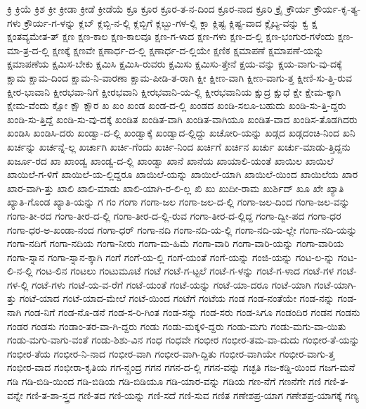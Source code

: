 {ಕ್ರಿ
ಕ್ರಿಯೆ
ಕ್ರಿಶ
ಕ್ರೀ
ಕ್ರೀಡಾ
ಕ್ರೀಡೆ
ಕ್ರೀಡೆಯೆ
ಕ್ರೂ
ಕ್ರೂರ
ಕ್ರೂರ-ತ-ನ-ದಿಂದ
ಕ್ರೂರ-ನಾದ
ಕ್ರೂರಿ
ಕ್ರೈ
ಕ್ರೌರ್ಯ
ಕ್ರೌರ್ಯ-ಕೃ-ತ್ಯ-ಗಳು
ಕ್ರೌರ್ಯ-ಗ-ಳನ್ನು
ಕ್ಲಬ್
ಕ್ಲಬ್ಬಿ-ನ-ಲ್ಲಿ
ಕ್ಲಬ್ಬಿಗೆ
ಕ್ಲಬ್ಬು-ಗಳ-ಲ್ಲಿ
ಕ್ಲಾ
ಕ್ಲಿಷ್ಟ
ಕ್ಲಿಷ್ಟ-ವಾದ
ಕ್ಲೈಬ್ಯ-ವನ್ನು
ಕ್ವ
ಕ್ಷ
ಕ್ಷಂತವ್ಯಮೇತ-ತ್
ಕ್ಷಣ
ಕ್ಷಣ-ಕಾಲ
ಕ್ಷಣ-ಕಾಲವೂ
ಕ್ಷಣ-ಗ-ಳಾದ
ಕ್ಷಣ-ಗಳು
ಕ್ಷಣ-ದ-ಲ್ಲಿ
ಕ್ಷಣ-ಭಂಗುರ-ಗಳೆಂದು
ಕ್ಷಣ-ಮಾ-ತ್ರ-ದ-ಲ್ಲಿ
ಕ್ಷಣಕ್ಕೆ
ಕ್ಷಣವೇ
ಕ್ಷಣಾರ್ಧ-ದ-ಲ್ಲಿ
ಕ್ಷಣಾರ್ಧ-ದ-ಲ್ಲಿಯೇ
ಕ್ಷಣಿಕ
ಕ್ಷಮಾಪಣೆ
ಕ್ಷಮಾಪಣೆ-ಯನ್ನು
ಕ್ಷಮಾಪಣೆಯ
ಕ್ಷಮಿಸ-ಬೇಕು
ಕ್ಷಮಿಸಿ
ಕ್ಷಮಿಸಿ-ರುವರು
ಕ್ಷಮಿಸು
ಕ್ಷಮಿಸು-ತ್ತೇನೆ
ಕ್ಷಯ-ವನ್ನು
ಕ್ಷಯ-ವಾಗು-ವು-ದಕ್ಕೆ
ಕ್ಷಾಮ
ಕ್ಷಾಮ-ದಿಂದ
ಕ್ಷಾಮ-ನಿ-ವಾರಣಾ
ಕ್ಷಾಮ-ಪೀಡಿ-ತ-ರಾಗಿ
ಕ್ಷೀ
ಕ್ಷೀಣ-ವಾಗಿ
ಕ್ಷೀಣ-ವಾಗು-ತ್ತ
ಕ್ಷೀಣಿ-ಸು-ತ್ತಿ-ರುವ
ಕ್ಷೀರ-ಭಾವಾನಿ
ಕ್ಷೀರಭವಾ-ನಿಗೆ
ಕ್ಷೀರಭವಾನಿ
ಕ್ಷೀರಭವಾನಿ-ಯ-ಲ್ಲಿ
ಕ್ಷೀರಭವಾನಿಯ
ಕ್ಷುದ್ರ
ಕ್ಷುಧೆ
ಕ್ಷೇ
ಕ್ಷೇಮ-ಕ್ಕಾಗಿ
ಕ್ಷೇಮ-ವೆಂದು
ಕ್ಷೋ
ಕ್ಷೌ
ಕ್ಷೌರ
ಖ
ಖಂ
ಖಂಡ
ಖಂಡ-ದ-ಲ್ಲಿ
ಖಂಡದ
ಖಂಡಿ-ಸಲೂ-ಬಹುದು
ಖಂಡಿ-ಸು-ತ್ತಿ-ದ್ದರು
ಖಂಡಿ-ಸು-ತ್ತಿದ್ದೆ
ಖಂಡಿ-ಸು-ವು-ದಕ್ಕೆ
ಖಂಡಿತ
ಖಂಡಿತ-ವಾಗಿ
ಖಂಡಿತ-ವಾಗಿಯೂ
ಖಂಡಿತ-ವಾದ
ಖಂಡಿಸ-ತೊಡಗಿದರು
ಖಂಡಿಸಿ
ಖಂಡಿಸಿ-ದರು
ಖಂಡ್ವಾ-ದ-ಲ್ಲಿ
ಖಂಡ್ವಾಕ್ಕೆ
ಖಂಡ್ವಾದ-ಲ್ಲಿದ್ದು
ಖಚೋರಿ-ಯನ್ನು
ಖಡ್ಗದ
ಖಡ್ಗದಂಚಿ-ನಿಂದ
ಖನಿ
ಖರ್ಚನ್ನು
ಖರ್ಚನ್ನೆ-ಲ್ಲ
ಖರ್ಚಾಗಿ
ಖರ್ಚಿ-ಗೆಂದು
ಖರ್ಚಿ-ನಿಂದ
ಖರ್ಚಿಗೆ
ಖರ್ಚಿನ
ಖರ್ಚು
ಖರ್ಚು-ಮಾಡು-ತ್ತಿದ್ದನು
ಖರ್ಜೂ-ರದ
ಖಾ
ಖಾಂಡ್ವ
ಖಾಂಡ್ವ-ದ-ಲ್ಲಿ
ಖಾಂಡ್ವಾ
ಖಾನೆ
ಖಾನೆಯ
ಖಾಯಾಲಿ-ಯಂತೆ
ಖಾಯಿಲ
ಖಾಯಿಲೆ
ಖಾಯಿಲೆ-ಗ-ಳಿಗೆ
ಖಾಯಿಲೆ-ಯ-ಲ್ಲಿದ್ದರೂ
ಖಾಯಿಲೆ-ಯನ್ನು
ಖಾಯಿಲೆ-ಯಾಗಿ
ಖಾಯಿಲೆ-ಯಿಂದ
ಖಾಯಿಲೆಯ
ಖಾರ
ಖಾರ-ವಾಗಿ-ತ್ತು
ಖಾಲಿ
ಖಾಲಿ-ಮಾಡು
ಖಾಲಿ-ಯಾಗಿ-ರ-ಲಿ-ಲ್ಲ
ಖಿ
ಖು
ಖುದೀ-ರಾಮ
ಖುರ್ಶಿದ್
ಖೂ
ಖೇ
ಖ್ಯಾತಿ
ಖ್ಯಾತಿ-ಗೊಂಡ
ಖ್ಯಾತಿ-ಯನ್ನು
ಗ
ಗಂ
ಗಂಗಾ
ಗಂಗಾ-ಜಲ
ಗಂಗಾ-ಜಲ-ದ-ಲ್ಲಿ
ಗಂಗಾ-ಜಲ-ದಿಂದ
ಗಂಗಾ-ಜಲ-ವನ್ನು
ಗಂಗಾ-ತೀ-ರದ
ಗಂಗಾ-ತೀರ-ದ-ಲ್ಲಿ
ಗಂಗಾ-ತೀರ-ದ-ಲ್ಲಿ-ರುವ
ಗಂಗಾ-ತೀರ-ದ-ಲ್ಲಿದ್ದ
ಗಂಗಾ-ದ್ವೀ-ಪದ
ಗಂಗಾ-ಧರ
ಗಂಗಾ-ಧರ-ಅ-ಖಂಡಾ-ನಂದ
ಗಂಗಾ-ಧರ್
ಗಂಗಾ-ನದಿ
ಗಂಗಾ-ನದಿ-ಯ-ಲ್ಲಿ
ಗಂಗಾ-ನದಿ-ಯ-ಲ್ಲೇ
ಗಂಗಾ-ನದಿ-ಯನ್ನು
ಗಂಗಾ-ನದಿಗೆ
ಗಂಗಾ-ನದಿಯ
ಗಂಗಾ-ನೀರು
ಗಂಗಾ-ಮ-ಹಿಮೆ
ಗಂಗಾ-ವಾರಿ
ಗಂಗಾ-ವಾರಿ-ಯನ್ನು
ಗಂಗಾ-ವಾರಿಯ
ಗಂಗಾ-ಸ್ನಾನ
ಗಂಗಾ-ಸ್ನಾನ-ಕ್ಕಾಗಿ
ಗಂಗೆ
ಗಂಗೆ-ಯ-ಲ್ಲಿ
ಗಂಗೆ-ಯಂತೆ
ಗಂಗೆ-ಯನ್ನು
ಗಂಜಿ-ಯನ್ನು
ಗಂಟ-ಲ-ನ್ನು
ಗಂಟ-ಲಿ-ನ-ಲ್ಲಿ
ಗಂಟ-ಲಿನ
ಗಂಟಲು
ಗಂಟುಮೂಟೆ
ಗಂಟೆ
ಗಂಟೆ-ಗ-ಟ್ಟಲೆ
ಗಂಟೆ-ಗ-ಳನ್ನು
ಗಂಟೆ-ಗ-ಳಾದ
ಗಂಟೆ-ಗಳ
ಗಂಟೆ-ಗಳ-ಲ್ಲಿ
ಗಂಟೆ-ಗಳು
ಗಂಟೆ-ಯ-ವ-ರೆಗೆ
ಗಂಟೆ-ಯಂತೆ
ಗಂಟೆ-ಯನ್ನು
ಗಂಟೆ-ಯಾ-ದರೂ
ಗಂಟೆ-ಯಾಗಿ
ಗಂಟೆ-ಯಾಗಿ-ತ್ತು
ಗಂಟೆ-ಯಾದ
ಗಂಟೆ-ಯಾದ-ಮೇಲೆ
ಗಂಟೆ-ಯಿಂದ
ಗಂಟೆಗೆ
ಗಂಟೆಯ
ಗಂಡ
ಗಂಡ-ನಂತೆಯೇ
ಗಂಡ-ನನ್ನು
ಗಂಡ-ನಾಗಿ
ಗಂಡ-ನಿಗೆ
ಗಂಡ-ನೊ-ಡನೆ
ಗಂಡ-ಸ-ರಿ-ಗಿಂತ
ಗಂಡ-ಸನ್ನು
ಗಂಡ-ಸರು
ಗಂಡ-ಸಿಗೂ
ಗಂಡಂದಿರ
ಗಂಡನ
ಗಂಡನು
ಗಂಡರ
ಗಂಡಸು
ಗಂಡಾಂ-ತರ-ವಾ-ಗಿ-ದ್ದರು
ಗಂಡು
ಗಂಡು-ಮಕ್ಕಳಿ-ದ್ದರು
ಗಂಡು-ಮಗು
ಗಂಡು-ಮಗು-ವಾ-ಯಿತು
ಗಂಡು-ಮಗು-ವಾಗು-ವಂತೆ
ಗಂಡು-ಶಿಶು-ವಿನ
ಗಂಧ
ಗಂಧವೇ
ಗಂಭೀರ
ಗಂಭೀರ-ತಮ-ವಾ-ದುದು
ಗಂಭೀರ-ತೆ-ಯನ್ನು
ಗಂಭೀರ-ತೆಯ
ಗಂಭೀರ-ನಿ-ನಾದ
ಗಂಭೀರ-ವಾಗಿ
ಗಂಭೀರ-ವಾಗಿ-ದ್ದಿತು
ಗಂಭೀರ-ವಾಗಿಯೇ
ಗಂಭೀರ-ವಾಗು-ತ್ತ
ಗಂಭೀರ-ವಾದ
ಗಂಭೀರಾ-ಕೃತಿಯ
ಗಗ-ನ್ಚಂದ್ರ
ಗಗನ
ಗಗನ-ದ-ಲ್ಲಿ
ಗಗನ-ವನ್ನು
ಗಚ್ಛತಿ
ಗಜ-ಕಡ್ಡಿ-ಯಿಂದ
ಗಜಗ-ಮನೆ
ಗಡಿ
ಗಡಿ-ಬಿಡಿ-ಯಿಂದ
ಗಡಿ-ಬಿಡಿಯ
ಗಡಿ-ಬಿಡಿಯೂ
ಗಡಿ-ಯಾರ-ವನ್ನು
ಗಡಿಯ
ಗಣ-ನೆಗೆ
ಗಣನೆಗೇ
ಗಣಿ
ಗಣಿ-ತ-ವನ್ನೇ
ಗಣಿ-ತ-ಶಾ-ಸ್ತ್ರದ
ಗಣಿ-ತದ
ಗಣಿ-ಯನ್ನು
ಗಣಿ-ಸದೆ
ಗಣಿ-ಸುವ
ಗಣಿತ
ಗಣೇಶಪ್ರ-ಯಾಗ
ಗಣೇಶಪ್ರ-ಯಾಗಕ್ಕೆ
ಗಣ್ಯ
}
